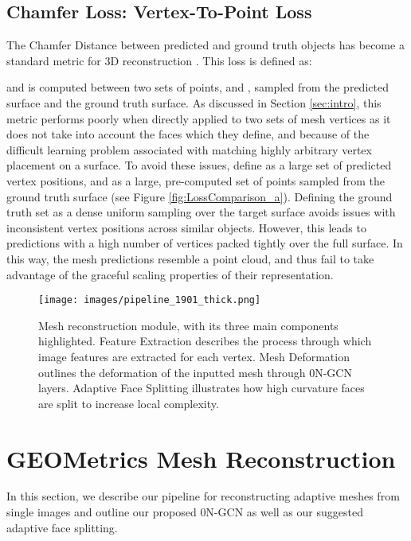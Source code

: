 \documentclass{article}
\begin{document}
\subsection{Chamfer Loss: Vertex-To-Point Loss}

The Chamfer Distance between predicted and ground truth objects has become a standard metric for 3D reconstruction \cite{Pixel2Mesh, insafutdinov2018unsupervised, groueix2018atlasnet,pix3d,fan2017point}. This loss is defined as:

and is computed between two sets of points,  and , sampled from the predicted surface and the ground truth surface. As discussed in Section \ref{sec:intro}, this metric performs poorly when directly applied to two sets of mesh vertices as it does not take into account the faces which they define, and because of the difficult learning problem associated with matching highly arbitrary vertex placement on a surface. To avoid these issues, \citet{Pixel2Mesh} define  as a large set of predicted vertex positions, and  as a large, pre-computed set of points sampled from the ground truth surface (see Figure \ref{fig:LossComparison_a}). 
Defining the ground truth set as a dense uniform sampling over the target surface avoids issues with inconsistent vertex positions across similar objects. However, this leads to predictions with a high number of vertices packed tightly over the full surface. In this way, the mesh predictions resemble a point cloud, and thus fail to take advantage of the graceful scaling properties of their representation.

\begin{figure*} 
\centering
\texttt{[image: images/pipeline\_1901\_thick.png]}
\vspace{-4mm}
\caption{Mesh reconstruction module, with its three main components highlighted. Feature Extraction describes the process through which image features are extracted for each vertex. Mesh Deformation outlines the deformation of the inputted mesh through 0N-GCN layers. Adaptive Face Splitting illustrates how high curvature faces are split to increase local complexity.} \label{fig:MeshGeneration}
\end{figure*}

\section{GEOMetrics Mesh Reconstruction}

In this section, we describe our pipeline for reconstructing adaptive meshes from single images and outline our proposed 0N-GCN as well as our suggested adaptive face splitting. 
\end{document}
